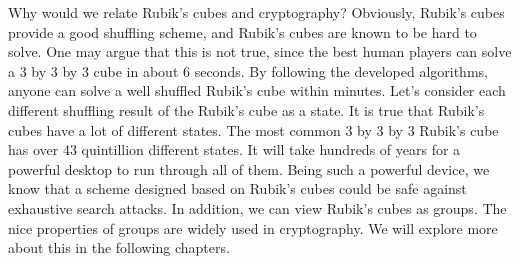 \par Why would we relate Rubik's cubes and cryptography?  Obviously, Rubik's cubes provide a good shuffling scheme, and Rubik's cubes are known to be hard to solve. One may argue that this is not true, since the best human players can solve a 3 by 3 by 3 cube in about 6 seconds. By following the developed algorithms, anyone can solve a well shuffled Rubik's cube within minutes. Let's consider each different shuffling result of the Rubik's cube as a state. It is true that Rubik's cubes have a lot of different states. The most common 3 by 3 by 3 Rubik's cube has over 43 quintillion different states. It will take hundreds of years for a powerful desktop to run through all of them. Being such a powerful device, we know that a scheme designed based on Rubik's cubes could be safe against exhaustive search attacks. In addition, we can view Rubik's cubes as groups. The nice properties of groups are widely used in cryptography. We will explore more about this in the following chapters.

